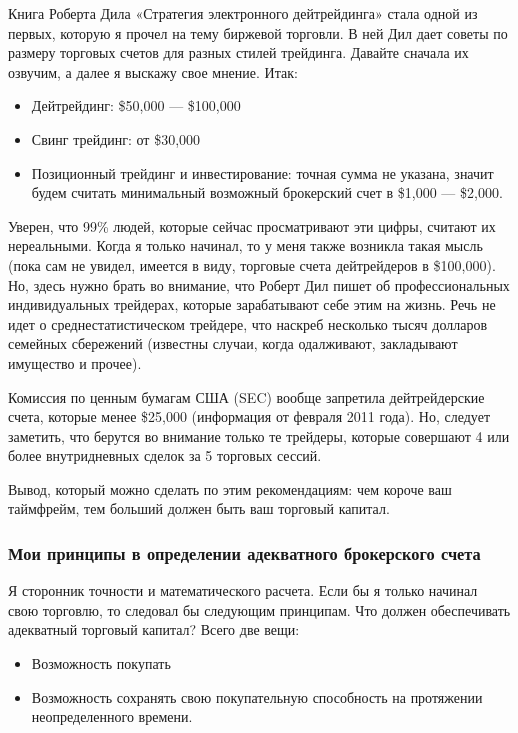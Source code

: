 \documentclass{book}
\begin{document}
Книга Роберта Дила «Стратегия электронного дейтрейдинга» стала одной из первых, которую я прочел на тему биржевой торговли. В ней Дил дает советы по размеру торговых счетов для разных стилей трейдинга. Давайте сначала их озвучим, а далее я выскажу свое мнение. Итак:
\begin{itemize}
\item     Дейтрейдинг: \$50,000 — \$100,000
\item     Свинг трейдинг: от \$30,000
\item     Позиционный трейдинг и инвестирование: точная сумма не указана, значит будем считать минимальный возможный брокерский счет в \$1,000 — \$2,000.
\end{itemize}

Уверен, что 99\% людей, которые сейчас просматривают эти цифры, считают их нереальными. Когда я только начинал, то у меня также возникла такая мысль (пока сам не увидел, имеется в виду, торговые счета дейтрейдеров в \$100,000). Но, здесь нужно брать во внимание, что Роберт Дил пишет об профессиональных индивидуальных трейдерах, которые зарабатывают себе этим на жизнь. Речь не идет о среднестатистическом трейдере, что наскреб несколько тысяч долларов семейных сбережений (известны случаи, когда одалживают, закладывают имущество и прочее).

Комиссия по ценным бумагам США (SEC) вообще запретила дейтрейдерские счета, которые менее \$25,000 (информация от февраля 2011 года). Но, следует заметить, что берутся во внимание только те трейдеры, которые совершают 4 или более внутридневных сделок за 5 торговых сессий.

Вывод, который можно сделать по этим рекомендациям: чем короче ваш
таймфрейм, тем больший должен быть ваш торговый капитал.

\subsubsection{Мои принципы в определении адекватного брокерского
  счета}

Я сторонник точности и математического расчета. Если бы я только начинал свою торговлю, то следовал бы следующим принципам. Что должен обеспечивать адекватный торговый капитал? Всего две вещи:
\begin{itemize}
\item     Возможность покупать
\item     Возможность сохранять свою покупательную способность на протяжении неопределенного времени.
\end{itemize}
\end{document}
